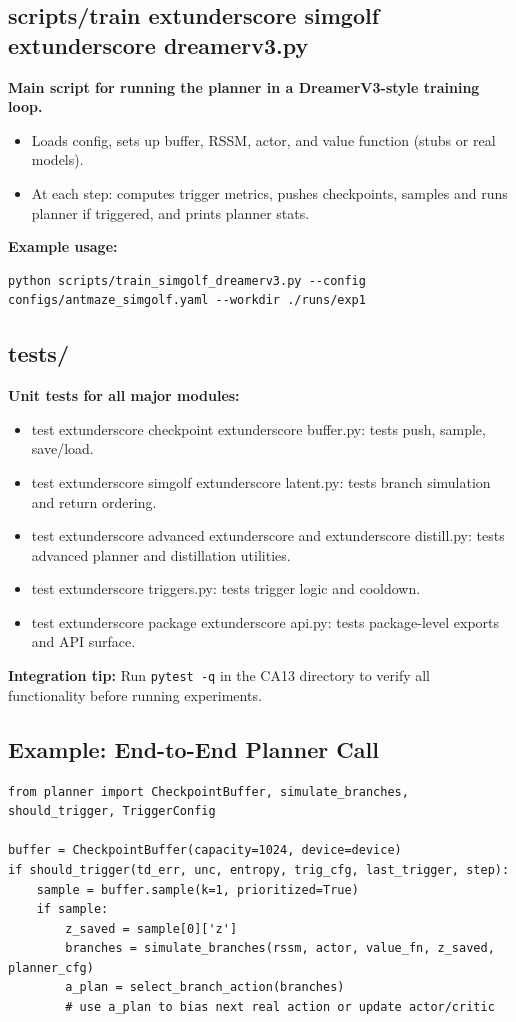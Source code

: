 \documentclass{article}
\begin{document}
\subsection{scripts/train	extunderscore simgolf	extunderscore dreamerv3.py}
\textbf{Main script for running the planner in a DreamerV3-style training loop.}
\begin{itemize}
\item Loads config, sets up buffer, RSSM, actor, and value function (stubs or real models).
\item At each step: computes trigger metrics, pushes checkpoints, samples and runs planner if triggered, and prints planner stats.
\end{itemize}
\textbf{Example usage:}
\begin{verbatim}
python scripts/train_simgolf_dreamerv3.py --config configs/antmaze_simgolf.yaml --workdir ./runs/exp1
\end{verbatim}

\subsection{tests/}
\textbf{Unit tests for all major modules:}
\begin{itemize}
\item test	extunderscore checkpoint	extunderscore buffer.py: tests push, sample, save/load.
\item test	extunderscore simgolf	extunderscore latent.py: tests branch simulation and return ordering.
\item test	extunderscore advanced	extunderscore and	extunderscore distill.py: tests advanced planner and distillation utilities.
\item test	extunderscore triggers.py: tests trigger logic and cooldown.
\item test	extunderscore package	extunderscore api.py: tests package-level exports and API surface.
\end{itemize}
\textbf{Integration tip:} Run \texttt{pytest -q} in the CA13 directory to verify all functionality before running experiments.

\subsection{Example: End-to-End Planner Call}
\begin{verbatim}
from planner import CheckpointBuffer, simulate_branches, should_trigger, TriggerConfig

buffer = CheckpointBuffer(capacity=1024, device=device)
if should_trigger(td_err, unc, entropy, trig_cfg, last_trigger, step):
    sample = buffer.sample(k=1, prioritized=True)
    if sample:
        z_saved = sample[0]['z']
        branches = simulate_branches(rssm, actor, value_fn, z_saved, planner_cfg)
        a_plan = select_branch_action(branches)
        # use a_plan to bias next real action or update actor/critic
\end{verbatim}
\end{document}

